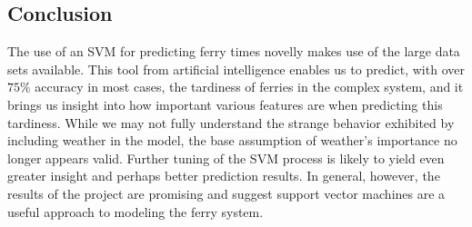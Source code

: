 \documentclass[11pt]{article} %
\begin{document}
\subsection{Conclusion}
\label{sec:conclusion}
The use of an SVM for predicting ferry times novelly makes use of the large data 
sets available. This tool from artificial intelligence enables us to predict, with
over $75\%$ accuracy in most cases, the tardiness of ferries in the complex system,
and it brings us insight into how important various features are when predicting
this tardiness. While we may not fully understand the strange behavior exhibited
by including weather in the model, the base assumption of weather's importance no 
longer appears valid. Further tuning of the SVM process is likely to yield even
greater insight and perhaps better prediction results. In general, however, the 
results of the project are promising and suggest support vector machines are
a useful approach to modeling the ferry system.

\newpage 



\end{document}
